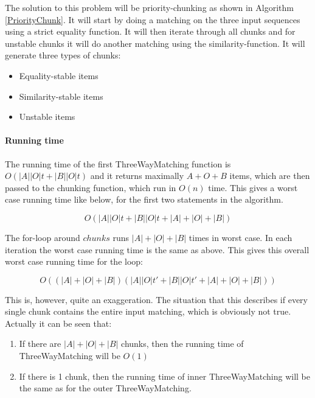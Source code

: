 \documentclass[11pt]{article}
\begin{document}
The solution to this problem will be priority-chunking as shown in Algorithm \ref{PriorityChunk}. It will start by doing a matching on the three input sequences using a strict equality function. It will then iterate through all chunks and for unstable chunks it will do another matching using the similarity-function. It will generate three types of chunks:

\begin{itemize}
   \item Equality-stable items
   \item Similarity-stable items
   \item Unstable items
\end{itemize}


\paragraph{Running time} The running time of the first ThreeWayMatching function is  $O(|A||O|t + |B||O|t)$ and it returns maximally $A+O+B$ items, which are then passed to the chunking function, which run in $O(n)$ time. This gives a worst case running time like below, for the first two statements in the algorithm.

\begin{equation}
O(|A||O|t + |B||O|t + |A|+|O|+|B|) \nonumber
\end{equation}

The for-loop around $chunks$ runs $|A|+|O|+|B|$ times in worst case. In each iteration the worst case running time is the same as above. This gives this overall worst case running time for the loop:

\begin{equation}
O((|A| + |O| + |B|) (|A||O|t' + |B||O|t' + |A|+|O|+|B|)) \nonumber
\end{equation}

This is, however, quite an exaggeration. The situation that this describes if every single chunk contains the entire input matching, which is obviously not true. Actually it can be seen that:

\begin{enumerate}
\item If there are $|A|+|O|+|B|$ chunks, then the running time of ThreeWayMatching will be $O(1)$
\item If there is 1 chunk, then the running time of inner ThreeWayMatching will be the same as for the outer ThreeWayMatching.
\end{enumerate}
\end{document}
